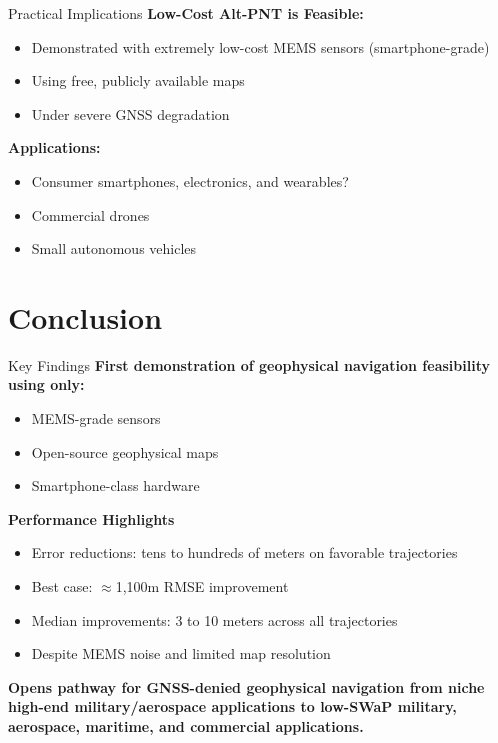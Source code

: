 \documentclass[aspectratio=169]{beamer}
\begin{document}
\begin{frame}{Practical Implications}
\textbf{Low-Cost Alt-PNT is Feasible:}
\begin{itemize}
    \item Demonstrated with extremely low-cost MEMS sensors (smartphone-grade)
    \item Using free, publicly available maps
    \item Under severe GNSS degradation
\end{itemize}
\pause
\textbf{Applications:}
\begin{itemize}
    \item Consumer smartphones, electronics, and wearables? \pause \textbf{\textcolor{red}{\texttimes}} \pause
    \item Commercial drones \pause \textbf{\textcolor{green}{\checkmark}} \pause
    \item Small autonomous vehicles \pause \textbf{\textcolor{green}{\checkmark}}
\end{itemize}
\end{frame}

\section{Conclusion}

\begin{frame}{Key Findings}
\textbf{First demonstration of geophysical navigation feasibility using only:}
\begin{itemize}
    \item MEMS-grade sensors
    \item Open-source geophysical maps
    \item Smartphone-class hardware
\end{itemize}
\pause
\textbf{Performance Highlights}
\begin{itemize}
    \item Error reductions: tens to hundreds of meters on favorable trajectories
    \item Best case: \(\approx\)1,100m RMSE improvement
    \item Median improvements: 3 to 10 meters across all trajectories
    \item Despite MEMS noise and limited map resolution
\end{itemize}
\pause
\textbf{Opens pathway for GNSS-denied geophysical navigation from niche high-end military/aerospace applications to low-SWaP military, aerospace, maritime, and commercial applications.}
\end{frame}
\end{document}
